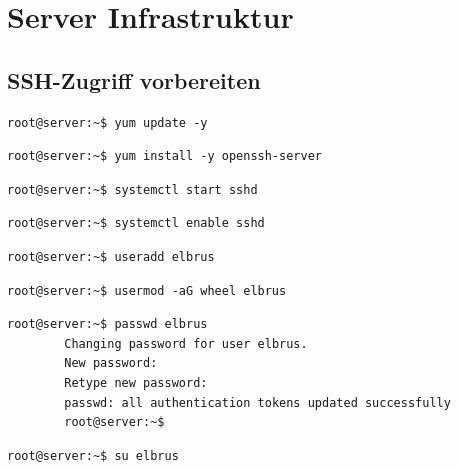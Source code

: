 \documentclass{article}
\begin{document}
	\section[Server Infrastruktur]{Server Infrastruktur}
	\subsection{SSH-Zugriff vorbereiten}
	
	\lstset{style=commands}
	\begin{lstlisting}[caption={Updaten vorhandener Packages.}]
		root@server:~$ yum update -y
	\end{lstlisting}
	
	\lstset{style=commands}
	\begin{lstlisting}[caption={Installieren des 'ssh' Packages.}]
		root@server:~$ yum install -y openssh-server
	\end{lstlisting}

	\lstset{style=commands}
	\begin{lstlisting}[caption={Starten des 'sshd' Services.}]
		root@server:~$ systemctl start sshd
	\end{lstlisting}

	\lstset{style=commands}
	\begin{lstlisting}[caption={Aktivieren des 'sshd' Services.}]
		root@server:~$ systemctl enable sshd
	\end{lstlisting}

	\lstset{style=commands}
	\begin{lstlisting}[caption={Anlegen des Users Elbrus.}]
		root@server:~$ useradd elbrus
	\end{lstlisting}

	\lstset{style=commands}
	\begin{lstlisting}[caption={Hinzufügen des Users Elbrus zu der Gruppe 'wheel'.}]
		root@server:~$ usermod -aG wheel elbrus
	\end{lstlisting}

	\lstset{style=commands}
	\begin{lstlisting}[caption={Ändern des Passwords für den User Elbrus.}]
		root@server:~$ passwd elbrus
		Changing password for user elbrus.
		New password:
		Retype new password:
		passwd: all authentication tokens updated successfully
		root@server:~$
	\end{lstlisting}

	\lstset{style=commands}
	\begin{lstlisting}[caption={Wechseln zu User elbrus.}]
		root@server:~$ su elbrus
	\end{lstlisting}
	
\end{document}
